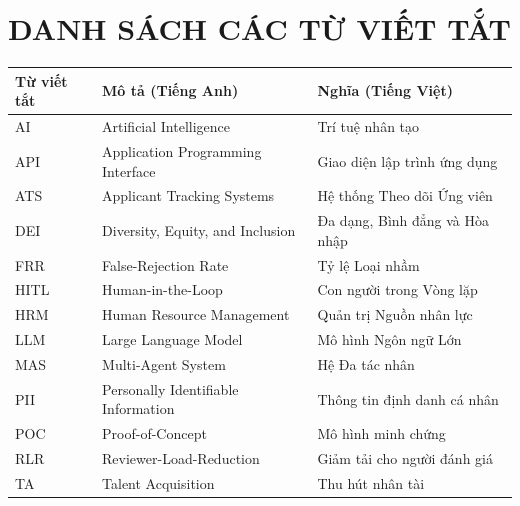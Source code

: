 \documentclass{article}
\begin{document}
\section*{DANH SÁCH CÁC TỪ VIẾT TẮT}
\begin{longtable}{|
  >{\raggedright\arraybackslash}p{}|
  >{\raggedright\arraybackslash}p{}|
  >{\raggedright\arraybackslash}p{}|}
  \hline
  \textbf{Từ viết tắt} &
  \textbf{Mô tả (Tiếng Anh)} &
  \textbf{Nghĩa (Tiếng Việt)} \\
  \hline
  \endfirsthead

  \endhead

  \hline
  \endfoot

  \hline
  \endlastfoot

  AI &
  Artificial Intelligence &
  Trí tuệ nhân tạo \\
  \hline

  API &
  Application Programming Interface &
  Giao diện lập trình ứng dụng \\
  \hline

  ATS &
  Applicant Tracking Systems &
  Hệ thống Theo dõi Ứng viên \\
  \hline

  DEI &
  Diversity, Equity, and Inclusion &
  Đa dạng, Bình đẳng và Hòa nhập \\
  \hline

  FRR &
  False-Rejection Rate &
  Tỷ lệ Loại nhầm \\
  \hline

  HITL &
  Human-in-the-Loop &
  Con người trong Vòng lặp \\
  \hline

  HRM &
  Human Resource Management &
  Quản trị Nguồn nhân lực \\
  \hline

  LLM &
  Large Language Model &
  Mô hình Ngôn ngữ Lớn \\
  \hline

  MAS &
  Multi-Agent System &
  Hệ Đa tác nhân \\
  \hline

  PII &
  Personally Identifiable Information &
  Thông tin định danh cá nhân \\
  \hline

  POC &
  Proof-of-Concept &
  Mô hình minh chứng \\
  \hline

  RLR &
  Reviewer-Load-Reduction &
  Giảm tải cho người đánh giá \\
  \hline

  TA &
  Talent Acquisition &
  Thu hút nhân tài \\

\end{longtable}
\end{document}
